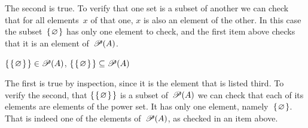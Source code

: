 \documentclass{test}  %
\begin{document}
\begin{problem}
\begin{exes}
\begin{answer}
  The second is true.
  To verify that one set is a subset of another we can check that for all
  elements~$x$ of that one, $x$ is also an element of the other.
  In this case the subset~$\mbox{$\{\hspace{0.1em}\varnothing\hspace{0.1em}\}$}$ has only one element to check,
  and the first item above checks that it is an element of~$\mathscr{P}(A)$.
\end{answer}
\begin{exercise} 
  $\mbox{$\{\hspace{0.1em}\mbox{$\{\hspace{0.1em}\varnothing\hspace{0.1em}\}$}\hspace{0.1em}\}$}\in\mathscr{P}(A)$,    
  $\mbox{$\{\hspace{0.1em}\mbox{$\{\hspace{0.1em}\varnothing\hspace{0.1em}\}$}\hspace{0.1em}\}$}\subseteq\mathscr{P}(A)$    
\end{exercise}
\begin{answer}
  The first is true by inspection, since it is the element that is listed
  third.
  To verify the second,
  that $\mbox{$\{\hspace{0.1em}\mbox{$\{\hspace{0.1em}\varnothing\hspace{0.1em}\}$}\hspace{0.1em}\}$}$ is a subset of~$\mathscr{P}(A)$
  we can check that each of its elements are elements of the power set.
  It has only one element, namely~$\mbox{$\{\hspace{0.1em}\varnothing\hspace{0.1em}\}$}$.
  That is indeed one of the elements of~$\mathscr{P}(A)$, as checked in 
  an item above.   
\end{answer}
\end{exes}




\end{problem}
\end{document}
